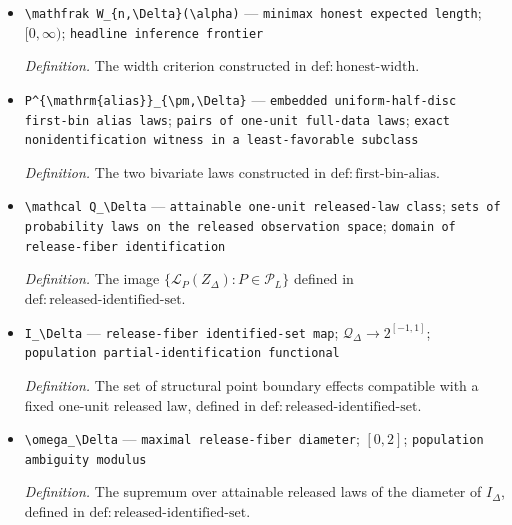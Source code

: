 \documentclass{article}
\begin{document}
\begin{itemize}
  \par\smallskip\noindent\emph{Definition.} The interval class constructed in \(\mathrm{def:honest\text{-}class}\).
  \item \texttt{\textbackslash{}\allowbreak{}mathfrak W\_\allowbreak{}\{n,\allowbreak{}\textbackslash{}\allowbreak{}Delta\}\allowbreak{}(\textbackslash{}\allowbreak{}alpha)} --- \texttt{minimax honest expected length}; \([0,\infty)\); \texttt{headline inference frontier}
  \par\smallskip\noindent\emph{Definition.} The width criterion constructed in \(\mathrm{def:honest\text{-}width}\).
  \item \texttt{P\textasciicircum{}\{\textbackslash{}\allowbreak{}mathrm\{alias\}\allowbreak{}\}\allowbreak{}\_\allowbreak{}\{\textbackslash{}\allowbreak{}pm,\allowbreak{}\textbackslash{}\allowbreak{}Delta\}\allowbreak{}} --- \texttt{embedded uniform-\allowbreak{}half-\allowbreak{}disc first-\allowbreak{}bin alias laws}; \texttt{pairs of one-\allowbreak{}unit full-\allowbreak{}data laws}; \texttt{exact nonidentification witness in a least-\allowbreak{}favorable subclass}
  \par\smallskip\noindent\emph{Definition.} The two bivariate laws constructed in \(\mathrm{def:first\text{-}bin\text{-}alias}\).
  \item \texttt{\textbackslash{}\allowbreak{}mathcal Q\_\allowbreak{}\textbackslash{}\allowbreak{}Delta} --- \texttt{attainable one-\allowbreak{}unit released-\allowbreak{}law class}; \texttt{sets of probability laws on the released observation space}; \texttt{domain of release-\allowbreak{}fiber identification}
  \par\smallskip\noindent\emph{Definition.} The image \(\{\mathcal L_P(Z_\Delta):P\in\mathcal P_L\}\) defined in \(\mathrm{def:released\text{-}identified\text{-}set}\).
  \item \texttt{I\_\allowbreak{}\textbackslash{}\allowbreak{}Delta} --- \texttt{release-\allowbreak{}fiber identified-\allowbreak{}set map}; \(\mathcal Q_\Delta\to 2^{[-1,1]}\); \texttt{population partial-\allowbreak{}identification functional}
  \par\smallskip\noindent\emph{Definition.} The set of structural point boundary effects compatible with a fixed one-unit released law, defined in \(\mathrm{def:released\text{-}identified\text{-}set}\).
  \item \texttt{\textbackslash{}\allowbreak{}omega\_\allowbreak{}\textbackslash{}\allowbreak{}Delta} --- \texttt{maximal release-\allowbreak{}fiber diameter}; \([0,2]\); \texttt{population ambiguity modulus}
  \par\smallskip\noindent\emph{Definition.} The supremum over attainable released laws of the diameter of \(I_\Delta\), defined in \(\mathrm{def:released\text{-}identified\text{-}set}\).
\end{itemize}
\end{document}
